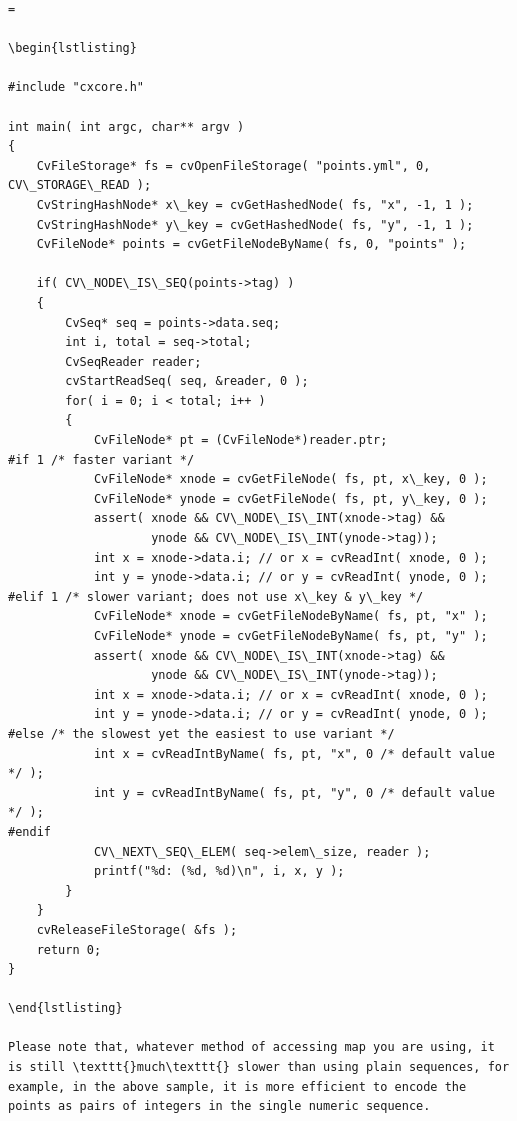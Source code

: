 \begin{verbatim}=

\begin{lstlisting}

#include "cxcore.h"

int main( int argc, char** argv )
{
    CvFileStorage* fs = cvOpenFileStorage( "points.yml", 0, CV\_STORAGE\_READ );
    CvStringHashNode* x\_key = cvGetHashedNode( fs, "x", -1, 1 );
    CvStringHashNode* y\_key = cvGetHashedNode( fs, "y", -1, 1 );
    CvFileNode* points = cvGetFileNodeByName( fs, 0, "points" );

    if( CV\_NODE\_IS\_SEQ(points->tag) )
    {
        CvSeq* seq = points->data.seq;
        int i, total = seq->total;
        CvSeqReader reader;
        cvStartReadSeq( seq, &reader, 0 );
        for( i = 0; i < total; i++ )
        {
            CvFileNode* pt = (CvFileNode*)reader.ptr;
#if 1 /* faster variant */
            CvFileNode* xnode = cvGetFileNode( fs, pt, x\_key, 0 );
            CvFileNode* ynode = cvGetFileNode( fs, pt, y\_key, 0 );
            assert( xnode && CV\_NODE\_IS\_INT(xnode->tag) &&
                    ynode && CV\_NODE\_IS\_INT(ynode->tag));
            int x = xnode->data.i; // or x = cvReadInt( xnode, 0 );
            int y = ynode->data.i; // or y = cvReadInt( ynode, 0 );
#elif 1 /* slower variant; does not use x\_key & y\_key */
            CvFileNode* xnode = cvGetFileNodeByName( fs, pt, "x" );
            CvFileNode* ynode = cvGetFileNodeByName( fs, pt, "y" );
            assert( xnode && CV\_NODE\_IS\_INT(xnode->tag) &&
                    ynode && CV\_NODE\_IS\_INT(ynode->tag));
            int x = xnode->data.i; // or x = cvReadInt( xnode, 0 );
            int y = ynode->data.i; // or y = cvReadInt( ynode, 0 );
#else /* the slowest yet the easiest to use variant */
            int x = cvReadIntByName( fs, pt, "x", 0 /* default value */ );
            int y = cvReadIntByName( fs, pt, "y", 0 /* default value */ );
#endif
            CV\_NEXT\_SEQ\_ELEM( seq->elem\_size, reader );
            printf("%d: (%d, %d)\n", i, x, y );
        }
    }
    cvReleaseFileStorage( &fs );
    return 0;
}

\end{lstlisting}

Please note that, whatever method of accessing map you are using, it is still \texttt{}much\texttt{} slower than using plain sequences, for example, in the above sample, it is more efficient to encode the points as pairs of integers in the single numeric sequence.


\end{verbatim}
